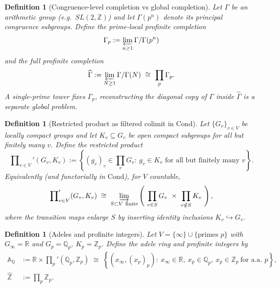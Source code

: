 \documentclass[11pt]{article}
\newtheorem{definition}[theorem]{Definition}
\theoremstyle{remark}
\begin{document}
{\begin{definition}[Congruence-level completion vs global completion]\label{D:def:completion_levels}
Let $\Gamma$ be an arithmetic group (e.g.\ $SL(2,\mathbb Z)$) and let $\Gamma(p^{n})$ denote its principal congruence subgroups.
Define the prime-local profinite completion
\begin{equation}
\Gamma_{p}:=\varprojlim_{n\ge 1}\Gamma/\Gamma(p^{n})
\label{D:eq:Gamma_p}
\end{equation}
and the full profinite completion
\begin{equation}
\widehat{\Gamma}:=\varprojlim_{N\ge 1}\Gamma/\Gamma(N)\ \cong\ \prod_{p}\Gamma_{p}.
\label{D:eq:Gamma_hat}
\end{equation}
A single-prime tower fixes $\Gamma_{p}$, reconstructing the diagonal copy of $\Gamma$ inside $\widehat{\Gamma}$ is a separate global problem.
\end{definition} 
\begin{definition}[Restricted product as filtered colimit in $\mathrm{Cond}$]\label{D:def:restricted_product}
Let $\{G_{v}\}_{v\in V}$ be locally compact groups and let $K_{v}\subseteq G_{v}$ be open compact subgroups for all but finitely many $v$.
Define the restricted product
\begin{equation}
\prod\nolimits_{v\in V}'(G_{v},K_{v})
:=
\left\{(g_{v})_{v}\in \prod_{v}G_{v}:\ g_{v}\in K_{v}\text{ for all but finitely many }v\right\}.
\label{D:eq:restricted_product_set}
\end{equation}
Equivalently (and functorially in $\mathrm{Cond}$), for $V$ countable,
\begin{equation}
\prod\nolimits_{v\in V}'(G_{v},K_{v})
\;\cong\;
\varinjlim_{S\subset V\ \mathrm{finite}}
\left(\ \prod_{v\in S}G_{v}\ \times\ \prod_{v\notin S}K_{v}\ \right),
\label{D:eq:restricted_product_colim}
\end{equation}
where the transition maps enlarge $S$ by inserting identity inclusions $K_{v}\hookrightarrow G_{v}$.
\end{definition}

\begin{definition}[Adeles and profinite integers]\label{D:def:adeles}
Let $V=\{\infty\}\cup\{\text{primes }p\}$ with $G_{\infty}=\mathbb R$ and $G_{p}=\mathbb Q_{p}$, $K_{p}=\mathbb Z_{p}$.
Define the adele ring and profinite integers by
\begin{align}
\mathbb A_{\mathbb Q}
&:=\mathbb R\times \prod\nolimits_{p}'(\mathbb Q_{p},\mathbb Z_{p})
\;\cong\;
\left\{(x_{\infty},(x_{p})_{p}):\ x_{\infty}\in\mathbb R,\ x_{p}\in\mathbb Q_{p},\ x_{p}\in\mathbb Z_{p}\ \text{for a.a.\ }p\right\},
\label{D:eq:AQ}\\
\widehat{\mathbb Z}
&:=\prod_{p}\mathbb Z_{p}.
\label{D:eq:Zhat}
\end{align}
\end{definition}

}
\end{document}
